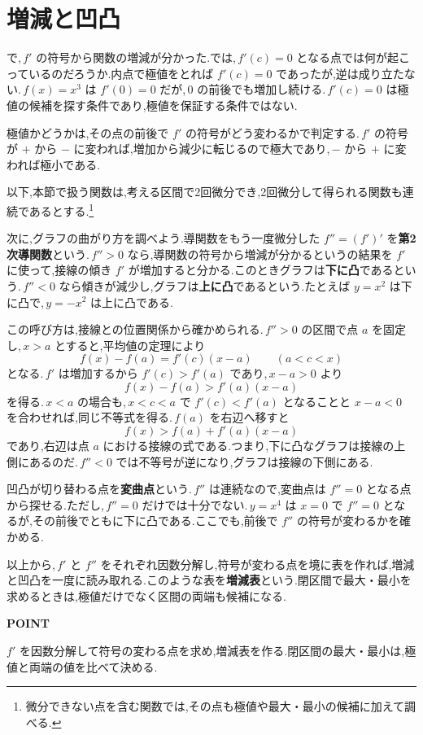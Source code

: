 \section{増減と凹凸}\label{節:増減凹凸}
で,\,$f'$ の符号から関数の増減が分かった.では,\,$f'(c)=0$ となる点では何が起こっているのだろうか.内点で極値をとれば $f'(c)=0$ であったが,逆は成り立たない.\,$f(x)=x^3$ は $f'(0)=0$ だが,\,$0$ の前後でも増加し続ける.\,$f'(c)=0$ は極値の候補を探す条件であり,極値を保証する条件ではない.

極値かどうかは,その点の前後で $f'$ の符号がどう変わるかで判定する.\,$f'$ の符号が $+$ から $-$ に変われば,増加から減少に転じるので極大であり,\,$-$ から $+$ に変われば極小である.

以下,本節で扱う関数は,考える区間で2回微分でき,2回微分して得られる関数も連続であるとする.\footnote{微分できない点を含む関数では,その点も極値や最大・最小の候補に加えて調べる.}

次に,グラフの曲がり方を調べよう.導関数をもう一度微分した $f''=(f')'$ を\textbf{第2次導関数}という.\label{用語:第2次導関数}\,$f''>0$ なら,導関数の符号から増減が分かるというの結果を $f'$ に使って,接線の傾き $f'$ が増加すると分かる.このときグラフは\textbf{下に凸}であるという.\,$f''<0$ なら傾きが減少し,グラフは\textbf{上に凸}であるという.たとえば $y=x^2$ は下に凸で,\,$y=-x^2$ は上に凸である.

この呼び方は,接線との位置関係から確かめられる.\,$f''>0$ の区間で点 $a$ を固定し,\,$x>a$ とすると,平均値の定理により
\[
 f(x)-f(a)=f'(c)(x-a)\qquad(a<c<x)
\]
となる.\,$f'$ は増加するから $f'(c)>f'(a)$ であり,\,$x-a>0$ より
\[
 f(x)-f(a)>f'(a)(x-a)
\]
を得る.\,$x<a$ の場合も,\,$x<c<a$ で $f'(c)<f'(a)$ となることと $x-a<0$ を合わせれば,同じ不等式を得る.\,$f(a)$ を右辺へ移すと
\[
 f(x)>f(a)+f'(a)(x-a)
\]
であり,右辺は点 $a$ における接線の式である.つまり,下に凸なグラフは接線の上側にあるのだ.\,$f''<0$ では不等号が逆になり,グラフは接線の下側にある.

凹凸が切り替わる点を\textbf{変曲点}という.\,$f''$ は連続なので,変曲点は $f''=0$ となる点から探せる.ただし,\,$f''=0$ だけでは十分でない.\,$y=x^4$ は $x=0$ で $f''=0$ となるが,その前後でともに下に凸である.ここでも,前後で $f''$ の符号が変わるかを確かめる.

以上から,\,$f'$ と $f''$ をそれぞれ因数分解し,符号が変わる点を境に表を作れば,増減と凹凸を一度に読み取れる.このような表を\textbf{増減表}という.閉区間で最大・最小を求めるときは,極値だけでなく区間の両端も候補になる.

\begin{bookpoint}
\textbf{POINT}\par
$f'$ を因数分解して符号の変わる点を求め,増減表を作る.閉区間の最大・最小は,極値と両端の値を比べて決める.
\end{bookpoint}

